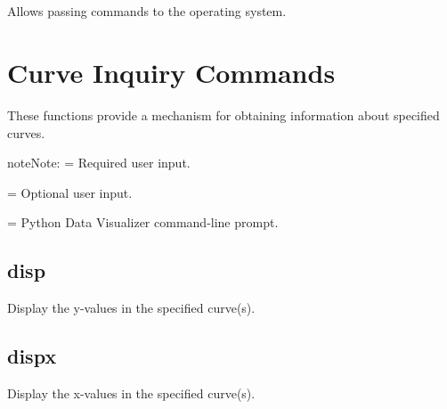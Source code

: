 \documentclass[letterpaper,10pt,english]{sphinxmanual}
\begin{document}
\subsection{}
\label{\detokenize{env_inquiry_cmds:system-2-4-2}}
Allows passing commands to the operating system. 

\begin{sphinxVerbatim}[commandchars=\\\{\}]
\PYG{p}{[}\PYG{p}{]}  
\end{sphinxVerbatim}


\section{Curve Inquiry Commands}
\label{\detokenize{curve_inquiry_cmds:curve-inquiry-commands}}\label{\detokenize{curve_inquiry_cmds:id1}}\label{\detokenize{curve_inquiry_cmds::doc}}
These functions provide a mechanism for obtaining information about specified curves.

\begin{sphinxadmonition}{note}{Note:}
\sphinxstylestrong{\textless{} \textgreater{}} = Required user input.

\sphinxstylestrong{{[} {]}} = Optional user input.

\sphinxstylestrong{{[}PyDV{]}:} = Python Data Visualizer command-line prompt.
\end{sphinxadmonition}


\subsection{disp}
\label{\detokenize{curve_inquiry_cmds:disp}}
Display the y-values in the specified curve(s).

\begin{sphinxVerbatim}[commandchars=\\\{\}]
\PYG{p}{[}\PYG{p}{]}  
\end{sphinxVerbatim}


\subsection{dispx}
\label{\detokenize{curve_inquiry_cmds:dispx}}
Display the x-values in the specified curve(s).
\end{document}
